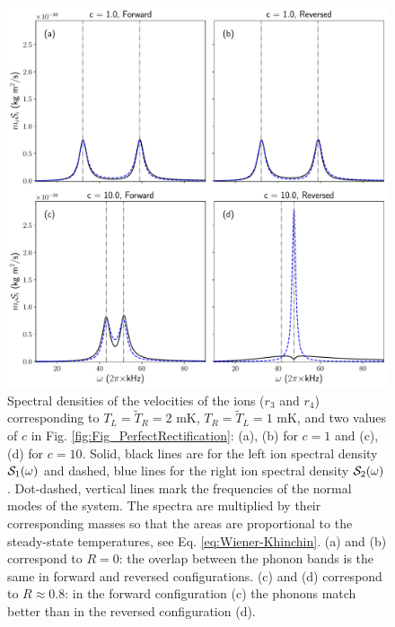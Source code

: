 \begin{figure}[t]
  \center
  \includegraphics[width=.8\linewidth]{Figures/SpectrumComparative.pdf}
  \caption{Spectral densities of the velocities of the ions ($r_3$ and $r_4$) corresponding to $T_L=\tilde{T}_R=2$ mK, $T_R=\tilde{T}_L=1$ mK, and  two values of $c$ in Fig. \ref{fig:Fig_PerfectRectification}: (a), (b) for $c=1$ and (c), (d) for $c=10$. Solid, black lines are for the left ion spectral density ${\cal{S}}_1(\omega)$ and dashed, blue lines for the right ion spectral density
 ${\cal{S}}_2(\omega)$. Dot-dashed, vertical lines mark the frequencies of the normal modes of the system. The spectra are multiplied by their corresponding masses so that  the areas are proportional to the steady-state temperatures, see  Eq. \eqref{eq:Wiener-Khinchin}. (a) and (b) correspond to $R = 0$:  the overlap between the phonon bands is the same in forward and reversed configurations. (c) and (d) correspond to $R\approx 0.8$:  in the forward configuration (c)  the phonons match better than in the reversed configuration (d).}
  \label{fig:Figure_Spectra}
\end{figure}

